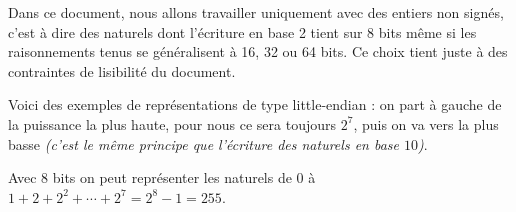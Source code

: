 Dans ce document, nous allons travailler uniquement avec des entiers non signés, c'est à dire des naturels dont l'écriture en base 2 tient sur 8 bits même si les raisonnements tenus se généralisent à 16, 32 ou 64 bits. Ce choix tient juste à des contraintes de lisibilité du document.

\medskip

Voici des exemples de représentations de type little-endian : on part à gauche de la puissance la plus haute, pour nous ce sera toujours $2^7$, puis on va vers la plus basse \emph{(c'est le même principe que l'écriture des naturels en base $10$)}.

\medskip


\medskip


\medskip

Avec 8 bits on peut représenter les naturels de $0$ à $1 + 2 + 2^2 + \cdots + 2^7 = 2^8 - 1 = 255$.